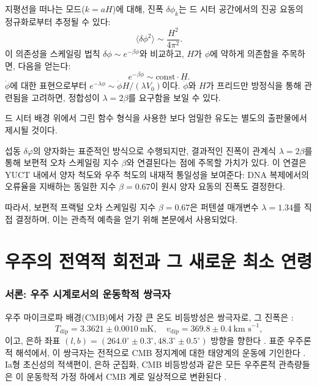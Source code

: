 \documentclass[11pt,a4paper]{article}
\begin{document}
	지평선을 떠나는 모드(\(k = aH\))에 대해, 진폭 \(\delta\phi_k\)는 드 시터 공간에서의 진공 요동의 정규화로부터 추정될 수 있다:
	\begin{equation}
		\langle \delta\phi^2 \rangle \sim \frac{H^2}{4\pi^2}.
	\end{equation}
	이 의존성을 스케일링 법칙 \(\delta\phi \sim e^{-\beta\phi}\)와 비교하고, \(H\)가 \(\phi\)에 약하게 의존함을 주목하면, 다음을 얻는다:
	\begin{equation}
		e^{-\beta\phi} \sim \text{const} \cdot H.
	\end{equation}
	\(\dot{\phi}\)에 대한 표현으로부터 \(e^{-\lambda\phi} \sim \dot{\phi} H / (\lambda V_0)\)이다. \(\dot{\phi}\)와 \(H\)가 프리드만 방정식을 통해 관련됨을 고려하면, 정합성이 \(\lambda = 2\beta\)를 요구함을 보일 수 있다.
	
	드 시터 배경 위에서 그린 함수 형식을 사용한 보다 엄밀한 유도는 별도의 출판물에서 제시될 것이다.
	
	섭동 \(\delta\varphi\)의 양자화는 표준적인 방식으로 수행되지만, 결과적인 진폭이 관계식 \(\lambda = 2\beta\)를 통해 보편적 오차 스케일링 지수 \(\beta\)와 연결된다는 점에 주목할 가치가 있다. 이 연결은 YUCT 내에서 양자 척도와 우주 척도의 내재적 통일성을 보여준다: DNA 복제에서의 오류율을 지배하는 동일한 지수 \(\beta = 0.67\)이 원시 양자 요동의 진폭도 결정한다.
	
	따라서, 보편적 프랙털 오차 스케일링 지수 \(\beta = 0.67\)은 퍼텐셜 매개변수 \(\lambda = 1.34\)를 직접 결정하며, 이는 관측적 예측을 얻기 위해 본문에서 사용되었다.
	
	\part{우주의 전역적 회전과 그 새로운 최소 연령}
	\label{part:IV}
	
	\section{서론: 우주 시계로서의 운동학적 쌍극자}
	
	우주 마이크로파 배경(CMB)에서 가장 큰 온도 비등방성은 쌍극자로, 그 진폭은 \cite{Planck2018VI, Planck2018VII}:
	\begin{equation}
		T_{\text{dip}} = 3.3621 \pm 0.0010\ \text{mK}, \quad v_{\text{dip}} = 369.8 \pm 0.4\ \text{km s}^{-1},
	\end{equation}
	이고, 은하 좌표 \((l,b) = (264.0^\circ \pm 0.3^\circ, 48.3^\circ \pm 0.5^\circ)\) 방향을 향한다 \cite{Planck2018I}. 표준 우주론적 해석에서, 이 쌍극자는 전적으로 CMB 정지계에 대한 태양계의 운동에 기인한다 \cite{PlanckIntLVI}. Ia형 초신성의 적색편이, 은하 군집화, CMB 비등방성과 같은 모든 우주론적 관측량들은 이 운동학적 가정 하에서 CMB 계로 일상적으로 변환된다 \cite{Planck2018V,Planck2018VI}.
	
\end{document}

